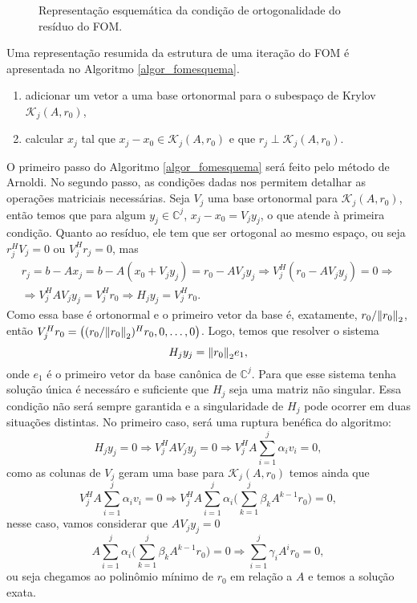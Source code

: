 \begin{figure}[htb]
  \caption{Representação esquemática da condição de ortogonalidade do  resíduo do FOM.}\label{fig_kryakrybfom}
\end{figure}

Uma representação resumida da estrutura de uma iteração do FOM é apresentada no Algoritmo \ref{algor_fomesquema}.
     \begin{algor}[htb]
\caption{Ortogonalização completa $(A,\;x_0)$ - resumo de uma iteração}\label{algor_fomesquema}
{%
\begin{enumerate}
\renewcommand{\labelenumi}{\theenumi:}
\setlength{\itemsep}{.01cm}
\item\label{algor_fomesquema_arnoldi} adicionar um vetor a uma base ortonormal para o subespaço de Krylov $\mathcal{K}_j(A,r_0)$,
\item\label{algor_fomesquema_xjrj} calcular $x_j$ tal que $x_j-x_0\in \mathcal{K}_j(A,r_0)$ e que $r_j\perp \mathcal{K}_j(A,r_0)$.
\renewcommand{\labelenumi}{\theenumi.}
\end{enumerate}
}
\end{algor}
O primeiro passo do Algoritmo \ref{algor_fomesquema} será feito pelo método de Arnoldi. No segundo passo, as condições dadas nos permitem detalhar as operações matriciais necessárias. Seja $V_j$ uma base ortonormal para $\mathcal{K}_j(A,r_0)$, então temos que para algum $y_j\in\mathbb{C}^j$, $x_j-x_0=V_jy_j$, o que atende à primeira condição. Quanto ao  resíduo, ele tem que ser ortogonal ao mesmo espaço, ou seja $r_j^HV_j=0$ ou $V_j^Hr_j=0$, mas
\begin{multline*}
r_j=b-Ax_j=b-A(x_0+V_jy_j)=r_0-AV_jy_j\Rightarrow V_j^H(r_0-AV_jy_j)=0\Rightarrow \\ \Rightarrow V_j^HAV_jy_j=V_j^Hr_0 \Rightarrow H_jy_j=V_j^Hr_0.
\end{multline*}
Como essa base é ortonormal e o primeiro vetor da base é, exatamente, $r_0/{\Vert r_0\Vert}_2$, então $V_j^Hr_0=\big((r_0/{\Vert r_0\Vert}_2)^Hr_0,0,\ldots,0\big)$. Logo, temos que resolver o sistema
\[
H_jy_j={\Vert r_0\Vert}_2 e_1,
\]
onde $e_1$ é o primeiro vetor da base canônica de $\mathbb{C}^j$. Para que esse sistema tenha solução única é necessáro e suficiente que $H_j$ seja uma matriz não singular. Essa condição não será sempre garantida e a singularidade de $H_j$ pode ocorrer em duas situações distintas. No primeiro caso, será uma ruptura benéfica do algoritmo:
\[
H_jy_j=0\Rightarrow V_j^HAV_jy_j=0\Rightarrow V_j^HA\sum_{i=1}^j\alpha_iv_i=0,
\]
como as colunas de $V_j$ geram uma base para   $\mathcal{K}_j(A,r_0)$ temos ainda que
\[
V_j^HA\sum_{i=1}^j\alpha_iv_i=0\Rightarrow V_j^HA\sum_{i=1}^j\alpha_i\bigg(\sum_{k=1}^j\beta_k A^{k-1}r_0\bigg)=0,
\]
nesse caso, vamos considerar que $AV_jy_j=0$
\[
A\sum_{i=1}^j\alpha_i\bigg(\sum_{k=1}^j\beta_k A^{k-1}r_0\bigg)=0\Rightarrow \sum_{i=1}^j \gamma_i A^ir_0=0,
\]
ou seja chegamos ao polinômio mínimo de $r_0$ em relação a $A$ e temos a solução exata.


